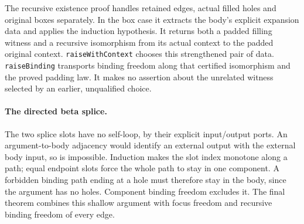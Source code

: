The recursive existence proof handles retained edges, actual filled holes
and original boxes separately. In the box case it extracts the body's
explicit expansion data and applies the induction hypothesis. It returns
both a padded filling witness and a recursive isomorphism from its actual
context to the padded original context. \texttt{raiseWithContext} chooses
this strengthened pair of data. \texttt{raiseBinding} transports binding
freedom along that certified isomorphism and the proved padding law. It
makes no assertion about the unrelated witness selected by an earlier,
unqualified choice.

\par{}
\par{}

\paragraph{The directed beta splice.}
The two splice slots have no self-loop, by their explicit input/output
ports. An argument-to-body adjacency would identify an external output
with the external body input, so is impossible. Induction makes the slot
index monotone along a path; equal endpoint slots force the whole path to
stay in one component. A forbidden binding path ending at a hole must
therefore stay in the body, since the argument has no holes. Component
binding freedom excludes it. The final theorem combines this shallow
argument with focus freedom and recursive binding freedom of every edge.

\par{}

